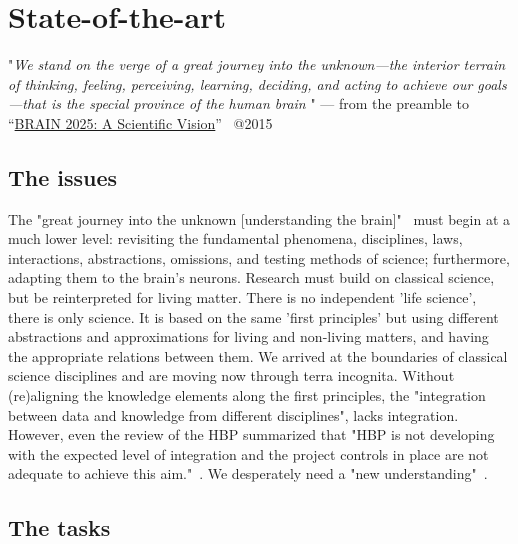 
\chapter*{State-of-the-art\label{ch:StateOfTheArt}}

\quotationbox
{
"\textit{We stand on the verge of a great journey into the unknown—the interior terrain of thinking, feeling, perceiving, learning, deciding, and acting to achieve our goals—that is the special province of the human brain
}"
 — from the preamble to “\href{https://www.sciencedirect.com/science/article/pii/S089662732400655X}{BRAIN 2025: A Scientific Vision}”~\cite{BrainInitiative10:2024} @2015
}

\section*{The issues\label{sec:StateOfTheArtIssues}}


The "great journey into the unknown [understanding the brain]"~\cite{BrainInitiative10:2024} must begin at a much lower level: revisiting the fundamental phenomena, disciplines, laws, interactions, abstractions, omissions, and testing methods of science; furthermore, adapting them to the brain's neurons. Research must build on classical science, but be reinterpreted for living matter.
There is no independent 'life science', there is only science. It is based on the same 'first principles' but using different abstractions and approximations for living and non-living matters, and having the appropriate relations between them.
We arrived at the boundaries
of classical science disciplines and are moving now through terra incognita.
Without (re)aligning the knowledge elements along the first principles, the "integration between data and knowledge from different disciplines", lacks integration.
However, even the review of the \gls{HBP} summarized that 
"\gls{HBP} is not developing with the expected level of integration and the project
controls in place are not adequate to achieve this aim."~\cite{HBP_1st_Review:2015}. We desperately need a "new understanding"~\cite{HBP_1st_Review:2015}.

 

\section*{The tasks\label{sec:StateTheTasks}}

